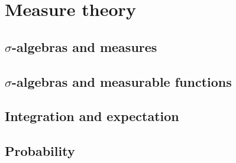 \chapter{Measure theory}\label{cha:essent-analys-prob}

\section{\(\sigma\)-algebras and measures}

\section{\(\sigma\)-algebras and measurable functions}

\section{Integration and expectation}

\section{Probability}

